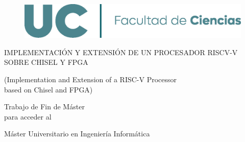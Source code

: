 \begin{titlepage}
\begin{figure}
    \centering
    \includegraphics[width=0.75\linewidth]{res/logo-facultad.png}
    \label{fig:logo-uc}
\end{figure}

\vspace*{140px}

\begin{center}
\Large{IMPLEMENTACIÓN Y EXTENSIÓN DE UN PROCESADOR RISCV-V SOBRE CHISEL Y FPGA}

\vspace{15px}

\large{(Implementation and Extension of a RISC-V Processor \\
based on Chisel and FPGA)}

\vspace{30px}

\normalsize{Trabajo de Fin de Máster\\para acceder al}

\vspace{15px}

\large{Máster Universitario en Ingeniería Informática}
\end{center}

\vspace{\fill}

\end{titlepage}